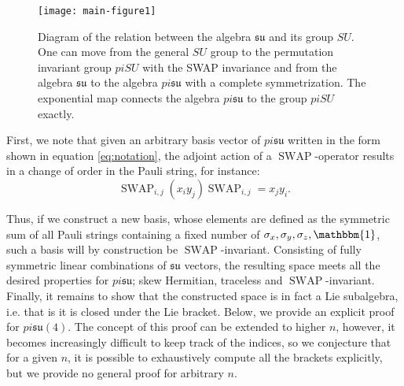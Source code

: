 \documentclass[%
 reprint,
 amsmath,amssymb,
 aps,
]{revtex4-2}
\theoremstyle{definition}%
\begin{document}
\begin{figure}[h]
    \centering
    \texttt{[image: main-figure1]}
    \caption{Diagram of the relation between the algebra $\mathfrak{su}$ and its group $SU$. One can move from the general $SU$ group to the permutation invariant group $piSU$ with the SWAP invariance and from the algebra $\mathfrak{su}$ to the algebra $pi\mathfrak{su}$ with a complete symmetrization. The exponential map connects the algebra $pi\mathfrak{su}$ to the group $piSU$ exactly.}
    \label{fig:algebragroupcon}
\end{figure}



First, we note that given an arbitrary basis vector of $pi\mathfrak{su}$ written in the form shown in equation \ref{eq:notation},  the adjoint action of a $\operatorname{SWAP}$-operator results in a change of order in the Pauli string, for instance:
\begin{equation}
    \operatorname{SWAP}_{i,j} (x_i y_j) \operatorname{SWAP}_{i,j}= x_jy_i.
\end{equation}


Thus, if we construct a new basis, whose elements are defined as the symmetric sum of all Pauli strings containing a fixed number of $\sigma_x,\sigma_y,\sigma_z, \mathbbm{1}$, such a basis will by construction be $\operatorname{SWAP}$-invariant. Consisting of fully symmetric linear combinations of $\mathfrak{su}$ vectors, the resulting space meets all the desired properties for $pi\mathfrak{su}$; skew Hermitian, traceless and $\operatorname{SWAP}$-invariant. Finally, it remains to show that the constructed space is in fact a Lie subalgebra, i.e. that is it is closed under the Lie bracket. Below, we provide an explicit proof for $pi\mathfrak{su}(4)$. The concept of this proof can be extended to higher $n$, however, it becomes increasingly difficult to keep track of the indices, so we conjecture that for a given $n$, it is possible to exhaustively compute all the brackets explicitly, but we provide no general proof for arbitrary $n$.\\
\end{document}
